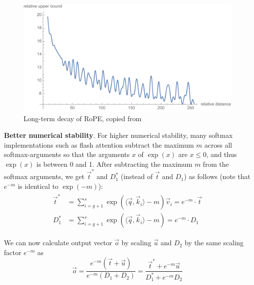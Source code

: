 \documentclass{article}
\numberwithin{equation}{section} %
\newcommand{\dpro}[1]{\langle #1 \rangle}  %
\def\q{\vec{q}}
\def\k{\vec{k}}
\def\v{\vec{v}}
\def\o{\vec{o}}
\def\t{\vec{t}}
\def\u{\vec{u}}
\def\dotqk{\dpro{\q, \k_i}}  %
\begin{document}
\begin{figure}[h!] \centering  %
  \includegraphics[scale=0.76]{figs/approximate_fig1.pdf}
  \caption{Long-term decay of RoPE, copied from \citep{RoPE}}
\label{fig1} \end{figure}

\textbf{Better numerical stability}.  For higher numerical stability, many softmax implementations such as flash attention \citep{flash-attention} subtract the maximum $m$ across all softmax-arguments so that the arguments $x$ of $\exp(x)$ are $x \leq 0$, and thus $\exp(x)$ is between 0 and 1. After subtracting the maximum $m$ from the softmax arguments, we get $\t^*$ and $D_1^*$ (instead of $\t$ and $D_1$) as follows (note that $e^{-m}$ is identical to $\exp(-m)$):
\begin{align} \begin{split}
  \t^*  &= \sum_{i=g+1}^s \exp(\dotqk -m) \v_i = e^{-m} \cdot \t \\
  D_1^* &= \sum_{i=g+1}^s \exp(\dotqk -m)      = e^{-m} \cdot D_1
\end{split} \end{align}

We can now calculate output vector $\o$ by scaling $\u$ and $D_2$ by the same scaling factor $e^{-m}$ as
\begin{equation}
  \o = \frac{e^{-m} (\t + \u)}{e^{-m} (D_1 + D_2)} = \frac{\t^* + e^{-m} \u}{D_1^* + e^{-m} D_2}
\label{eq2.4} \end{equation}
\end{document}
